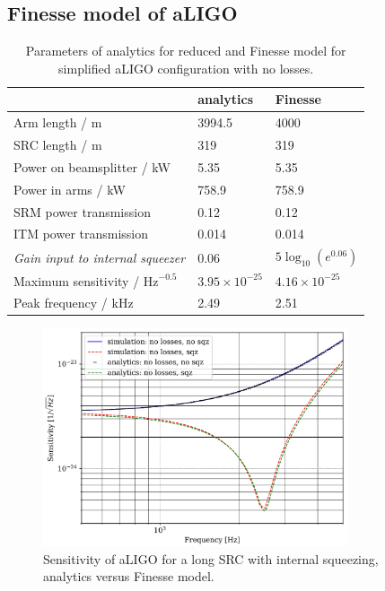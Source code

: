 \documentclass[aps,pra,superscriptaddress,reprint,nofootinbib]{revtex4-1}
\begin{document}
\subsection{Finesse model of aLIGO}

\begin{table}
	\centering
	\begin{tabular}{l|ll}
	 & analytics & Finesse \\ \hline
	Arm length / m & 3994.5 & 4000 \\
	SRC length / m & 319 & 319 \\
	Power on beamsplitter / kW & 5.35 & 5.35 \\
	Power in arms / kW & 758.9 & 758.9 \\
	SRM power transmission & 0.12 & 0.12 \\
	ITM power transmission & 0.014 & 0.014 \\
	\textit{Gain input to internal squeezer} & 0.06 & $5 \log_{10}(e^{0.06})$ \\
	Maximum sensitivity / $\mathrm{Hz}^{-0.5}$ & $3.95 \times 10^{-25}$ & $4.16 \times 10^{-25}$ \\
	Peak frequency / kHz & 2.49 & 2.51
	\end{tabular}%
	\caption{Parameters of analytics for reduced and Finesse model for simplified aLIGO configuration with no losses.}
	\label{tab:aLIGO_parameters}
\end{table}

\begin{figure}
	\begin{center}
	\includegraphics[width=0.8\textwidth]{figures/sqz_aLIGO_analytics_v_simulation.pdf}
	\end{center}
	\caption{Sensitivity of aLIGO for a long SRC with internal squeezing, analytics versus Finesse model.}
	\label{fig:sqz_aLIGO_analytics_v_simulation}
\end{figure}
\end{document}
